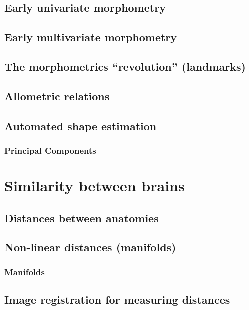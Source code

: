 \documentclass{beamer}
\begin{document}
    \subsection{Early univariate morphometry}
    \subsection{Early multivariate morphometry}
    \subsection{The morphometrics ``revolution'' (landmarks)}
    \subsection{Allometric relations}
    \subsection{Automated shape estimation}

        \subsubsection{Principal Components}     

\section{Similarity between brains}
    \subsection{Distances between anatomies} 
    \subsection{Non-linear distances (manifolds)}
        \subsubsection{Manifolds}                

    \subsection{Image registration for measuring distances}
\end{document}
